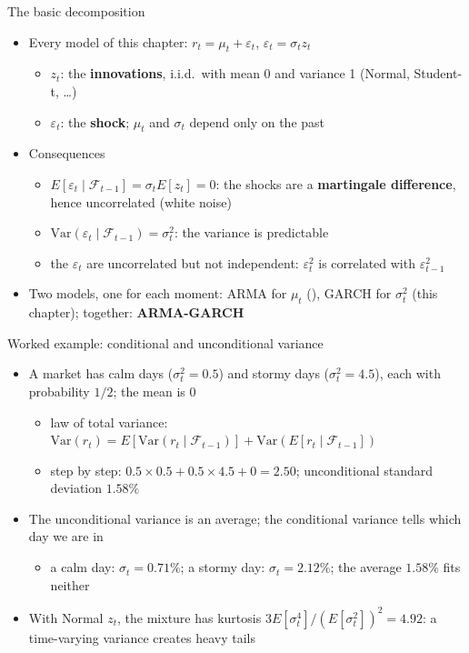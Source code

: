 \begin{frame}{The basic decomposition}
\itemsize{\small}
\begin{itemize}
    \item Every model of this chapter: $r_t = \mu_t + \varepsilon_t$, \quad $\varepsilon_t = \sigma_t z_t$
    \begin{itemize}
        \item $z_t$: the \textbf{innovations}, i.i.d.\ with mean 0 and variance 1 (Normal, Student-t, \dots)
        \item $\varepsilon_t$: the \textbf{shock}; $\mu_t$ and $\sigma_t$ depend only on the past
    \end{itemize}
    \item Consequences
    \begin{itemize}
        \item $E[\varepsilon_t \mid \mathcal{F}_{t-1}] = \sigma_t E[z_t] = 0$: the shocks are a \textbf{martingale difference}, hence uncorrelated (white noise)
        \item $\mathrm{Var}(\varepsilon_t \mid \mathcal{F}_{t-1}) = \sigma_t^2$: the variance is predictable
        \item the $\varepsilon_t$ are uncorrelated but not independent: $\varepsilon_t^2$ is correlated with $\varepsilon_{t-1}^2$
    \end{itemize}
    \item Two models, one for each moment: ARMA for $\mu_t$ (), GARCH for $\sigma_t^2$ (this chapter); together: \textbf{ARMA-GARCH}
\end{itemize}
\end{frame}

\begin{frame}{Worked example: conditional and unconditional variance}
\itemsize{\small}
\begin{itemize}
    \item A market has calm days ($\sigma_t^2 = 0.5$) and stormy days ($\sigma_t^2 = 4.5$), each with probability $1/2$; the mean is 0
    \begin{itemize}
        \item law of total variance: $\mathrm{Var}(r_t) = E[\mathrm{Var}(r_t \mid \mathcal{F}_{t-1})] + \mathrm{Var}(E[r_t \mid \mathcal{F}_{t-1}])$
        \item step by step: $0.5 \times 0.5 + 0.5 \times 4.5 + 0 = 2.50$; unconditional standard deviation $1.58\%$
    \end{itemize}
    \item The unconditional variance is an average; the conditional variance tells which day we are in
    \begin{itemize}
        \item a calm day: $\sigma_t = 0.71\%$; a stormy day: $\sigma_t = 2.12\%$; the average $1.58\%$ fits neither
    \end{itemize}
    \item With Normal $z_t$, the mixture has kurtosis $3E[\sigma_t^4]/(E[\sigma_t^2])^2 = 4.92$: a time-varying variance creates heavy tails
\end{itemize}
\end{frame}

